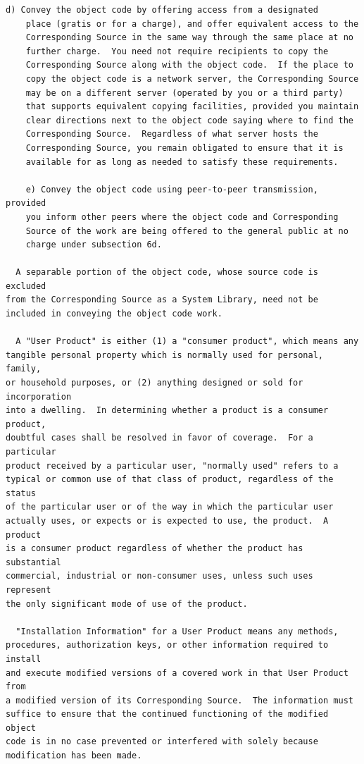\documentclass[letterpaper,10pt,english]{sphinxmanual}
\begin{document}
\begin{Verbatim}[commandchars=\\\{\}]
    d) Convey the object code by offering access from a designated
    place (gratis or for a charge), and offer equivalent access to the
    Corresponding Source in the same way through the same place at no
    further charge.  You need not require recipients to copy the
    Corresponding Source along with the object code.  If the place to
    copy the object code is a network server, the Corresponding Source
    may be on a different server (operated by you or a third party)
    that supports equivalent copying facilities, provided you maintain
    clear directions next to the object code saying where to find the
    Corresponding Source.  Regardless of what server hosts the
    Corresponding Source, you remain obligated to ensure that it is
    available for as long as needed to satisfy these requirements.

    e) Convey the object code using peer-to-peer transmission, provided
    you inform other peers where the object code and Corresponding
    Source of the work are being offered to the general public at no
    charge under subsection 6d.

  A separable portion of the object code, whose source code is excluded
from the Corresponding Source as a System Library, need not be
included in conveying the object code work.

  A "User Product" is either (1) a "consumer product", which means any
tangible personal property which is normally used for personal, family,
or household purposes, or (2) anything designed or sold for incorporation
into a dwelling.  In determining whether a product is a consumer product,
doubtful cases shall be resolved in favor of coverage.  For a particular
product received by a particular user, "normally used" refers to a
typical or common use of that class of product, regardless of the status
of the particular user or of the way in which the particular user
actually uses, or expects or is expected to use, the product.  A product
is a consumer product regardless of whether the product has substantial
commercial, industrial or non-consumer uses, unless such uses represent
the only significant mode of use of the product.

  "Installation Information" for a User Product means any methods,
procedures, authorization keys, or other information required to install
and execute modified versions of a covered work in that User Product from
a modified version of its Corresponding Source.  The information must
suffice to ensure that the continued functioning of the modified object
code is in no case prevented or interfered with solely because
modification has been made.


\end{Verbatim}
\end{document}
